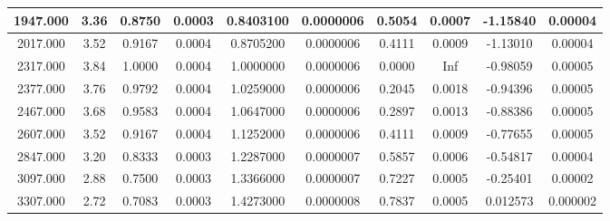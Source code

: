 \documentclass[12pt,a4paper]{article}
\begin{document}
\begin{table}[H]
\begin{tabular}{|c|c|c|c|c|c|c|c|c|c|}
    1947.000       & 3.36           & 0.8750            & 0.0003                 & 0.8403100         & 0.0000006              & 0.5054                   & 0.0007                      & -1.15840                   & 0.00004                       \\ \hline
    2017.000       & 3.52           & 0.9167            & 0.0004                 & 0.8705200         & 0.0000006              & 0.4111                   & 0.0009                      & -1.13010                   & 0.00004                       \\ \hline
    2317.000       & 3.84           & 1.0000            & 0.0004                 & 1.0000000         & 0.0000006              & 0.0000                   & Inf                         & -0.98059                   & 0.00005                       \\ \hline
    2377.000       & 3.76           & 0.9792            & 0.0004                 & 1.0259000         & 0.0000006              & 0.2045                   & 0.0018                      & -0.94396                   & 0.00005                       \\ \hline
    2467.000       & 3.68           & 0.9583            & 0.0004                 & 1.0647000         & 0.0000006              & 0.2897                   & 0.0013                      & -0.88386                   & 0.00005                       \\ \hline
    2607.000       & 3.52           & 0.9167            & 0.0004                 & 1.1252000         & 0.0000006              & 0.4111                   & 0.0009                      & -0.77655                   & 0.00005                       \\ \hline
    2847.000       & 3.20           & 0.8333            & 0.0003                 & 1.2287000         & 0.0000007              & 0.5857                   & 0.0006                      & -0.54817                   & 0.00004                       \\ \hline
    3097.000       & 2.88           & 0.7500            & 0.0003                 & 1.3366000         & 0.0000007              & 0.7227                   & 0.0005                      & -0.25401                   & 0.00002                       \\ \hline
    3307.000       & 2.72           & 0.7083            & 0.0003                 & 1.4273000         & 0.0000008              & 0.7837                   & 0.0005                      & 0.012573                   & 0.000002                      \\ \hline

\end{tabular}
\end{table}
\end{document}

